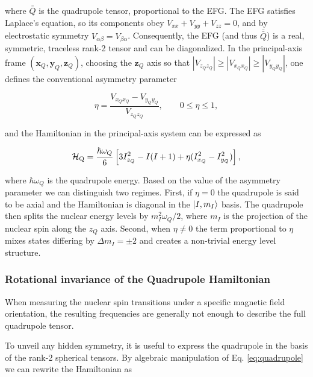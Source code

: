 \noindent where $\bar{\bar{Q}}$ is the quadrupole tensor, proportional to the EFG. The EFG satisfies Laplace's equation, so its components obey $V_{xx}+V_{yy}+V_{zz}=0$, and by electrostatic symmetry $V_{\alpha\beta}=V_{\beta\alpha}$. Consequently, the EFG (and thus $\bar{\bar{Q}}$) is a real, symmetric, traceless rank-2 tensor and can be diagonalized. In the principal-axis frame $(\mathbf{x}_Q,\mathbf{y}_Q,\mathbf{z}_Q)$, choosing the $\mathbf{z}_Q$ axis so that $|V_{z_Qz_Q}|\ge|V_{x_Qx_Q}|\ge|V_{y_Qy_Q}|$, one defines the conventional asymmetry parameter

\begin{equation}
    \eta = \frac{V_{x_Qx_Q}-V_{y_Qy_Q}}{V_{z_Qz_Q}}, \qquad 0\leq\eta\leq1,
\end{equation}

\noindent and the Hamiltonian in the principal-axis system can be expressed as

\begin{equation}
\mathcal{H}_{\text{Q}} = \frac{\hbar \omega_Q}{6}\left[ 3 I_{z_Q}^2 - I(I+1) + \eta(I_{x_Q}^2 - I_{y_Q}^2)\right],
\end{equation}

where $\hbar \omega_Q$ is the quadrupole energy. Based on the value of the asymmetry parameter we can distinguish two regimes. First, if $\eta=0$ the quadrupole is said to be axial and the Hamiltonian is diagonal in the $\ket{I,m_I}$ basis. The quadrupole then splits the nuclear energy levels by $m_I^2 \omega_Q/2 $, where $m_I$ is the projection of the nuclear spin along the $z_Q$ axis. Second, when $\eta\neq0$ the term proportional to $\eta$ mixes states differing by $\Delta m_I=\pm2$ and creates a non-trivial energy level structure. 


\subsubsection{Rotational invariance of the Quadrupole Hamiltonian}


When measuring the nuclear spin transitions under a specific magnetic field orientation, the resulting frequencies are generally not enough to describe the full quadrupole tensor. 

To unveil any hidden symmetry, it is useful to express the quadrupole in the basis of the rank-2 spherical tensors. By algebraic manipulation of Eq. \ref{eq:quadrupole} we can rewrite the Hamiltonian as

